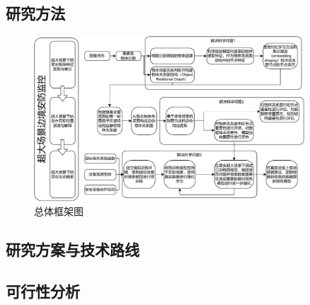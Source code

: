 \setlength{\abovedisplayskip}{0pt}
\setlength{\belowdisplayskip}{0pt}

\subsection{研究方法}

\begin{figure}[h!]
\centering 

\includegraphics[width=0.9\textwidth]{figures/framework.pdf}

\captionsetup{justification=centering}
\caption{总体框架图}
\label{fig:framework}
\end{figure}

\subsection{研究方案与技术路线}

% 
% 

\subsection{可行性分析}

